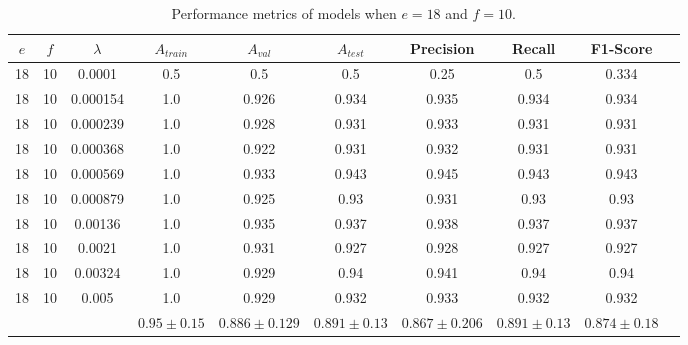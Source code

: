 \begin{table}[ht]
\centering
\begin{tabular}{ |c|c|c|c|c|c|c|c|c|c| }
\hline
$e$ & $f$ & $\lambda$ & $A_{train}$ & $A_{val}$ & $A_{test}$ & Precision & Recall & F1-Score \\
\hline
18 & 10 & 0.0001 & 0.5 & 0.5 & 0.5 & 0.25 & 0.5 & 0.334 \\
18 & 10 & 0.000154 & 1.0 & 0.926 & 0.934 & 0.935 & 0.934 & 0.934 \\
18 & 10 & 0.000239 & 1.0 & 0.928 & 0.931 & 0.933 & 0.931 & 0.931 \\
18 & 10 & 0.000368 & 1.0 & 0.922 & 0.931 & 0.932 & 0.931 & 0.931 \\
18 & 10 & 0.000569 & 1.0 & 0.933 & 0.943 & 0.945 & 0.943 & 0.943 \\
18 & 10 & 0.000879 & 1.0 & 0.925 & 0.93 & 0.931 & 0.93 & 0.93 \\
18 & 10 & 0.00136 & 1.0 & 0.935 & 0.937 & 0.938 & 0.937 & 0.937 \\
18 & 10 & 0.0021 & 1.0 & 0.931 & 0.927 & 0.928 & 0.927 & 0.927 \\
18 & 10 & 0.00324 & 1.0 & 0.929 & 0.94 & 0.941 & 0.94 & 0.94 \\
18 & 10 & 0.005 & 1.0 & 0.929 & 0.932 & 0.933 & 0.932 & 0.932 \\
\hline
 & & & $0.95\pm0.15$ & $0.886\pm0.129$ & $0.891\pm0.13$ & $0.867\pm0.206$ & $0.891\pm0.13$ & $0.874\pm0.18$ \\
\hline
\end{tabular}
\caption{Performance metrics of models when $e = 18$ and $f = 10$.}
\label{table:vgg16_finetuning_10}
\end{table}

